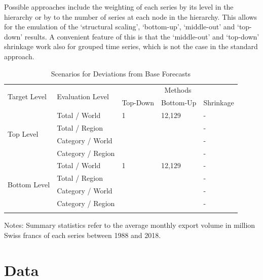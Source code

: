 \documentclass[a4paper,fleqn,11pt]{article}
\begin{document}
Possible approaches include the weighting of each series by its level in the hierarchy or by to the number of series at each node in the hierarchy. This allows for the emulation of the `structural scaling', `bottom-up', `middle-out' and `top-down' results. A convenient feature of this is that the `middle-out' and `top-down' shrinkage work also for grouped time series, which is not the case in the standard approach.

\begin{table}[H]
	\caption{Scenarios for Deviations from Base Forecasts}\label{tab:base_deviation}
	\small
	\begin{tabularx}{\textwidth}{p{2cm}p{3cm} XXX}
		\toprule
		\multirow{2}{*}{Target Level} & \multirow{2}{*}{Evaluation Level}  & \multicolumn{3}{c}{Methods}\\
				\cmidrule(lr{.5em}){3-5}
		& & Top-Down & Bottom-Up & Shrinkage  \\ 
		\midrule
		\multirow{4}{*}{Top Level} & Total / World & 1 & 12,129 & - \\
		& Total / Region & & & - \\ 
		& Category / World & & &  - \\ 
		& Category / Region & & & - \\ 
		\midrule
		\multirow{4}{*}{Bottom Level} & Total / World & 1 & 12,129 & - \\
		& Total / Region & & & - \\ 
		& Category / World & & &  - \\ 
		& Category / Region & & & - \\ 
		\bottomrule
		\addlinespace
	\end{tabularx}
	\footnotesize{Notes: Summary statistics refer to the average monthly export volume in million Swiss francs of each series between 1988 and 2018.}
\end{table}




\section{Data}\label{sec:datadesc}
\end{document}
